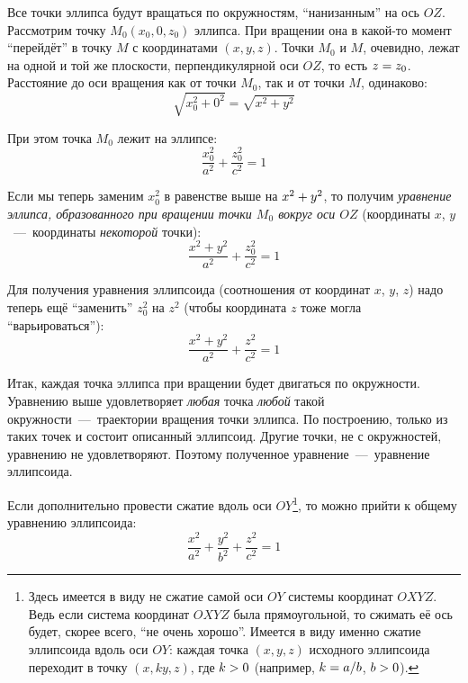 \documentclass[a4paper,12pt]{article}
\begin{document}
  Все точки эллипса будут вращаться по окружностям, ``нанизанным'' на ось $OZ$.
  Рассмотрим точку $M_0(x_0, 0, z_0)$ эллипса.
  При вращении она в какой-то момент ``перейдёт'' в точку $M$ с координатами $(x, y, z)$.
  Точки $M_0$ и $M$, очевидно, лежат на одной и той же плоскости, перпендикулярной оси $OZ$, то есть $z \hm= z_0$.
  Расстояние до оси вращения как от точки $M_0$, так и от точки $M$, одинаково:
  \[
    \sqrt{x_0^2 + 0^2} = \sqrt{x^2 + y^2}
  \]
  
  При этом точка $M_0$ лежит на эллипсе:
  \[
    \frac{x_0^2}{a^2} + \frac{z_0^2}{c^2} = 1
  \]
  
  Если мы теперь заменим $x_0^2$ в равенстве выше на $x^2 \hm+ y^2$, то получим \emph{уравнение эллипса, образованного при вращении точки $M_0$ вокруг оси $OZ$} (координаты $x$, $y$~---~координаты \emph{некоторой} точки):
  \[
    \frac{x^2 + y^2}{a^2} + \frac{z_0^2}{c^2} = 1
  \]
  
  Для получения уравнения эллипсоида (соотношения от координат $x$, $y$, $z$) надо теперь ещё ``заменить'' $z_0^2$ на $z^2$ (чтобы координата $z$ тоже могла ``варьироваться''):
  \[
    \frac{x^2 + y^2}{a^2} + \frac{z^2}{c^2} = 1
  \]
  
  Итак, каждая точка эллипса при вращении будет двигаться по окружности.
  Уравнению выше удовлетворяет \emph{любая} точка \emph{любой} такой окружности~---~траектории вращения точки эллипса.
  По построению, только из таких точек и состоит описанный эллипсоид.
  Другие точки, не с окружностей, уравнению не удовлетворяют.
  Поэтому полученное уравнение~---~уравнение эллипсоида.
  
  Если дополнительно провести сжатие вдоль оси $OY$\footnote{Здесь имеется в виду не сжатие самой оси $OY$ системы координат $OXYZ$. Ведь если система координат $OXYZ$ была прямоугольной, то сжимать её ось будет, скорее всего, ``не очень хорошо''. Имеется в виду именно сжатие эллипсоида вдоль оси $OY$: каждая точка $(x, y, z)$ исходного эллипсоида переходит в точку $(x, ky, z)$, где $k \hm> 0$ (например, $k \hm= a \hm/ b$, $b \hm> 0$).}, то можно прийти к общему уравнению эллипсоида:
  \begin{equation}
    \label{eq:ellipsoid}
    \boxed{
      \frac{x^2}{a^2} + \frac{y^2}{b^2} + \frac{z^2}{c^2} = 1
    }
  \end{equation}
  
\end{document}
